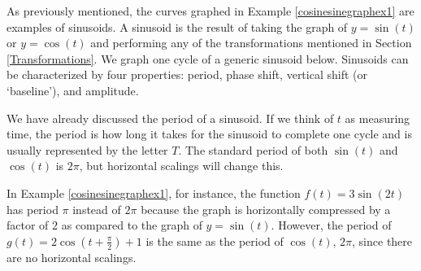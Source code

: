 \documentclass{ximera}
\begin{document}
As previously mentioned, the curves graphed in Example \ref{cosinesinegraphex1} are examples of sinusoids. A sinusoid is the result of taking the graph of $y = \sin(t)$ or $y  = \cos(t)$ and performing any of the transformations mentioned in Section \ref{Transformations}.  We graph one cycle of a generic sinusoid below.  Sinusoids can be characterized by four properties:  period, phase shift, vertical shift (or `baseline'), and amplitude.

\begin{image}
\end{image}

We have already discussed the period of a sinusoid.  If we think of $t$ as measuring time, the period is how long it takes for the sinusoid to complete one cycle and is usually represented by the letter $T$.   The standard period of both  $\sin(t)$ and $\cos(t)$  is $2\pi$, but horizontal scalings will change  this.

  In Example \ref{cosinesinegraphex1}, for instance,  the function  $f(t) = 3 \sin(2t)$ has period  $\pi$ instead of $2\pi$ because the graph is horizontally compressed by a factor of $2$ as compared to the graph of $y = \sin(t)$.    However, the period of  $g(t) = 2 \cos\left(t +\frac{\pi}{2} \right) +1$ is the same as the period of $\cos(t)$, $2\pi$, since there are no horizontal scalings.
  
\end{document}
